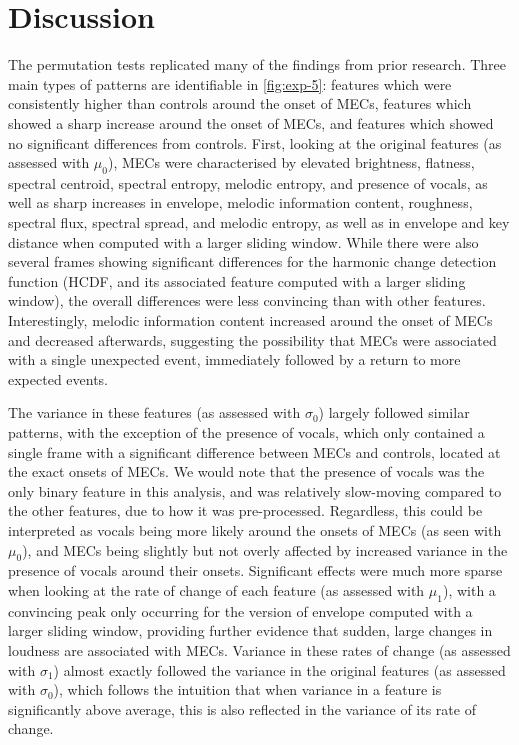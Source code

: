 \section{Discussion}

The permutation tests replicated many of the findings from prior research. Three main types of patterns are identifiable in \autoref{fig:exp-5}: features which were consistently higher than controls around the onset of MECs, features which showed a sharp increase around the onset of MECs, and features which showed no significant differences from controls. First, looking at the original features (as assessed with $\mu_0$), MECs were characterised by elevated brightness, flatness, spectral centroid, spectral entropy, melodic entropy, and presence of vocals, as well as sharp increases in envelope, melodic information content, roughness, spectral flux, spectral spread, and melodic entropy, as well as in envelope and key distance when computed with a larger sliding window. While there were also several frames showing significant differences for the harmonic change detection function (HCDF, and its associated feature computed with a larger sliding window), the overall differences were less convincing than with other features. Interestingly, melodic information content increased around the onset of MECs and decreased afterwards, suggesting the possibility that MECs were associated with a single unexpected event, immediately followed by a return to more expected events.

The variance in these features (as assessed with $\sigma_0$) largely followed similar patterns, with the exception of the presence of vocals, which only contained a single frame with a significant difference between MECs and controls, located at the exact onsets of MECs. We would note that the presence of vocals was the only binary feature in this analysis, and was relatively slow-moving compared to the other features, due to how it was pre-processed. Regardless, this could be interpreted as vocals being more likely around the onsets of MECs (as seen with $\mu_0$), and MECs being slightly but not overly affected by increased variance in the presence of vocals around their onsets. Significant effects were much more sparse when looking at the rate of change of each feature (as assessed with $\mu_1$), with a convincing peak only occurring for the version of envelope computed with a larger sliding window, providing further evidence that sudden, large changes in loudness are associated with MECs. Variance in these rates of change (as assessed with $\sigma_1$) almost exactly followed the variance in the original features (as assessed with $\sigma_0$), which follows the intuition that when variance in a feature is significantly above average, this is also reflected in the variance of its rate of change.


